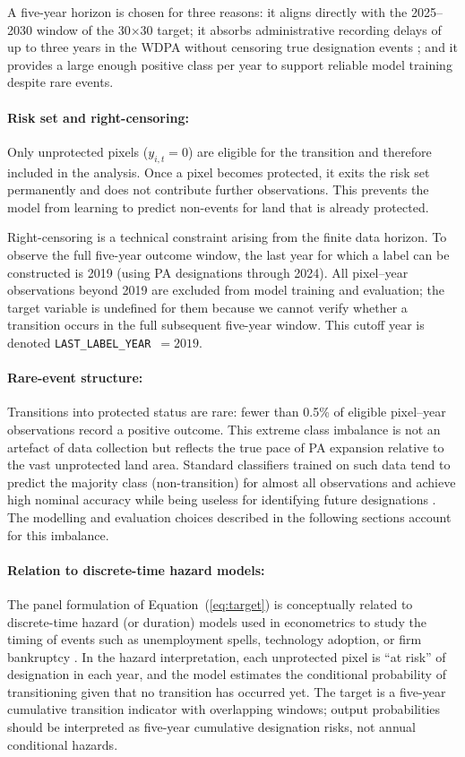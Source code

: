 \documentclass[12pt]{article}
\theoremstyle{break}
\begin{document}
A five-year horizon is chosen for three reasons: it aligns directly with the
2025--2030 window of the 30$\times$30 target; it absorbs administrative recording
delays of up to three years in the WDPA without censoring true designation events
\citep{bingham2019}; and it provides a large enough positive class per year to
support reliable model training despite rare events.

\paragraph{Risk set and right-censoring:}
Only unprotected pixels ($y_{i,t} = 0$) are eligible for the transition and therefore
included in the analysis. Once a pixel becomes protected, it exits the risk set
permanently and does not contribute further observations. This prevents the model from
learning to predict non-events for land that is already protected.

Right-censoring is a technical constraint arising from the finite data horizon.
To observe the full five-year outcome window, the last year for which a label can be
constructed is 2019 (using PA designations through 2024). All pixel--year observations
beyond 2019 are excluded from model training and evaluation; the target variable is
undefined for them because we cannot verify whether a transition occurs in the full
subsequent five-year window. This cutoff year is denoted \texttt{LAST\_LABEL\_YEAR}~$= 2019$.

\paragraph{Rare-event structure:}
Transitions into protected status are rare: fewer than 0.5\% of eligible pixel--year
observations record a positive outcome. This extreme class imbalance is not an
artefact of data collection but reflects the true pace of PA expansion relative to
the vast unprotected land area. Standard classifiers trained on such data tend to
predict the majority class (non-transition) for almost all observations and achieve
high nominal accuracy while being useless for identifying future designations
\citep{davis2006}. The modelling and evaluation choices described in the following
sections account for this imbalance.

\paragraph{Relation to discrete-time hazard models:}
The panel formulation of Equation~(\ref{eq:target}) is conceptually related to
discrete-time hazard (or duration) models used in econometrics to study the timing
of events such as unemployment spells, technology adoption, or firm bankruptcy
\citep{allison1982, singer1993}.
In the hazard interpretation, each unprotected pixel is ``at risk'' of designation
in each year, and the model estimates the conditional probability of transitioning
given that no transition has occurred yet. The target is a five-year cumulative transition indicator
with overlapping windows; output probabilities should be interpreted as five-year
cumulative designation risks, not annual conditional hazards.
\end{document}
